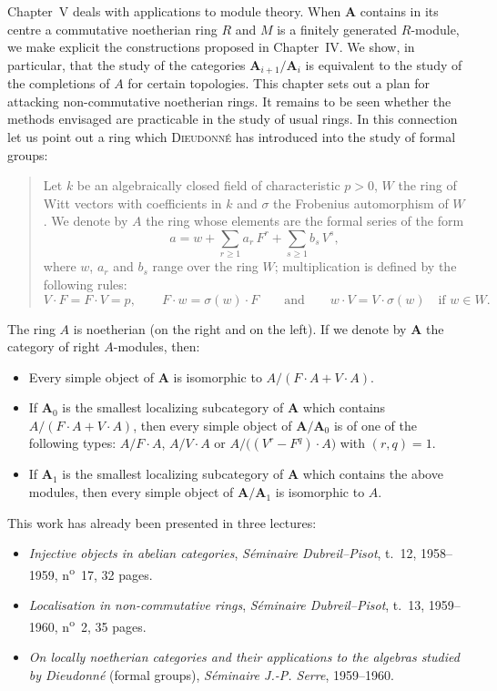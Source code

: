 Chapter~V deals with applications to module theory. When $\mathbf{A}$ contains
in its centre a commutative noetherian ring $R$ and $M$ is a finitely
generated $R$-module, we make explicit the constructions proposed in
Chapter~IV. We show, in particular, that the study of the categories
$\mathbf{A}_{i+1}/\mathbf{A}_i$ is equivalent to the study of the completions
of $A$ for certain topologies. This chapter sets out a plan for attacking
non-commutative noetherian rings. It remains to be seen whether the methods
envisaged are practicable in the study of usual rings. In this connection let
us point out a ring which \textsc{Dieudonn\'e} has introduced into the study of
formal groups:

\begin{quote}
Let $k$ be an algebraically closed field of characteristic $p>0$, $W$ the ring
of Witt vectors with coefficients in $k$ and $\sigma$ the Frobenius
automorphism of $W$. We denote by $A$ the ring whose elements are the formal
series of the form
\[
  a = w + \sum_{r\geq 1} a_r\, F^{r} + \sum_{s\geq 1} b_s\, V^{s},
\]
where $w$, $a_r$ and $b_s$ range over the ring $W$; multiplication is defined
by the following rules:
\[
  V \cdot F = F \cdot V = p, \qquad
  F \cdot w = \sigma(w) \cdot F \qquad\text{and}\qquad
  w \cdot V = V \cdot \sigma(w)
  \quad\text{if } w \in W.
\]
\end{quote}

The ring $A$ is noetherian (on the right and on the left). If we denote by
$\mathbf{A}$ the category of right $A$-modules, then:

\begin{itemize}
\item Every simple object of $\mathbf{A}$ is isomorphic to
      $A/(F \cdot A + V \cdot A)$.
\item If $\mathbf{A}_0$ is the smallest localizing subcategory of
      $\mathbf{A}$ which contains $A/(F \cdot A + V \cdot A)$, then every
      simple object of $\mathbf{A}/\mathbf{A}_0$ is of one of the following
      types: $A/F \cdot A$, $A/V \cdot A$ or $A/\big((V^{r} - F^{q})\cdot
      A\big)$ with $(r,q) = 1$.
\item If $\mathbf{A}_1$ is the smallest localizing subcategory of
      $\mathbf{A}$ which contains the above modules, then every simple object
      of $\mathbf{A}/\mathbf{A}_1$ is isomorphic to $A$.
\end{itemize}

This work has already been presented in three lectures:

\begin{itemize}
\item \emph{Injective objects in abelian categories},
      \emph{S\'eminaire Dubreil--Pisot}, t.~12, 1958--1959, n\textsuperscript{o}~17,
      32 pages.
\item \emph{Localisation in non-commutative rings}, \emph{S\'eminaire
      Dubreil--Pisot}, t.~13, 1959--1960, n\textsuperscript{o}~2, 35 pages.
\item \emph{On locally noetherian categories and their applications to the
      algebras studied by Dieudonn\'e} (formal groups), \emph{S\'eminaire
      J.-P. Serre}, 1959--1960.
\end{itemize}